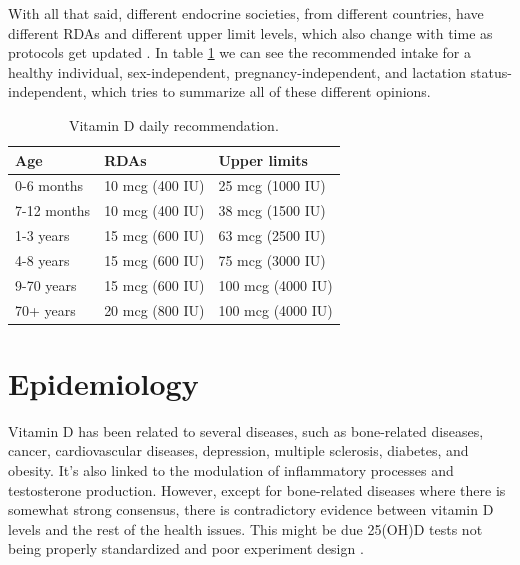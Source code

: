 With all that said, different endocrine societies, from different countries, have different RDAs and different upper limit levels, which also change with time as protocols get updated \cite{ref:Bouillon2017}. In table \ref{table:vitaminDRDAs} we can see the recommended intake for a healthy individual, sex-independent, pregnancy-independent, and lactation status-independent, which tries to summarize all of these different opinions.\vspace{3 mm}

\begin{table}[H]

    \caption{Vitamin D daily recommendation.}	
	\centering
	\begin{tabular}{|l|ll|}
		\hline
		\rowcolor[HTML]{FFAAAA} 
		Age                                 & RDAs           & Upper limits              \\ \hline
		\rowcolor[HTML]{FFFFFF} 
		\cellcolor[HTML]{FFFFC7}0-6 months  & 10 mcg (400 IU) & 25 mcg (1000 IU)  \\
		\rowcolor[HTML]{FFFFFF} 
		\cellcolor[HTML]{FFFFC7}7-12 months & 10 mcg (400 IU) & 38 mcg (1500 IU)  \\
		\rowcolor[HTML]{EFEFEF} 
		\cellcolor[HTML]{EDEDBD}1-3 years   & 15 mcg (600 IU) & 63 mcg (2500 IU)  \\
		\rowcolor[HTML]{EFEFEF} 
		\cellcolor[HTML]{EDEDBD}4-8 years   & 15 mcg (600 IU) & 75 mcg (3000 IU)  \\
		\rowcolor[HTML]{FFFFFF} 
		\cellcolor[HTML]{FFFFC7}9-70 years  & 15 mcg (600 IU) & 100 mcg (4000 IU) \\
		\rowcolor[HTML]{FFFFFF} 
		\cellcolor[HTML]{FFFFC7}70+ years   & 20 mcg (800 IU) & 100 mcg (4000 IU) \\ \hline
	\end{tabular}
    \label{table:vitaminDRDAs}
 
\end{table}



\label{lb:epidemiology}
\section{Epidemiology}


Vitamin D has been related to several diseases, such as bone-related diseases, cancer, cardiovascular diseases, depression, multiple sclerosis, diabetes, and obesity. It's also linked to the modulation of inflammatory processes and testosterone production. However, except for bone-related diseases where there is somewhat strong consensus, there is contradictory evidence between vitamin D levels and the rest of the health issues. This might be due 25(OH)D tests not being properly standardized and poor experiment design \cite{ref:A_Cashman2016, ref:Sempos2018, ref:Sempos20182}.


